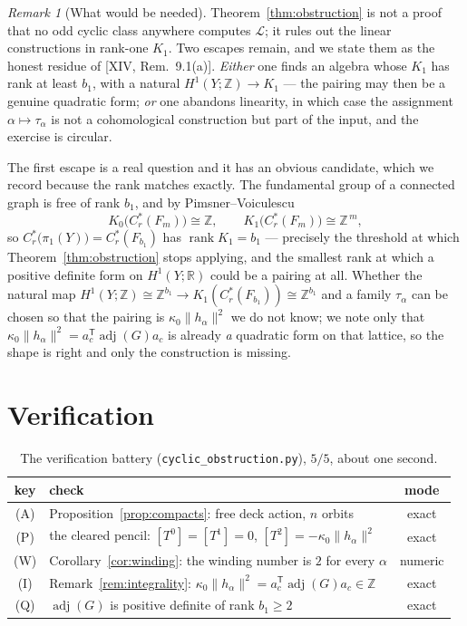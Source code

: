 \documentclass[11pt]{amsart}
\numberwithin{equation}{section}
\theoremstyle{definition}
\theoremstyle{remark}
\newtheorem{remark}[theorem]{Remark}
\newcommand{\Z}{\mathbb{Z}}
\newcommand{\R}{\mathbb{R}}
\newcommand{\cL}{\mathcal{L}}
\newcommand{\rank}{\operatorname{rank}}
\begin{document}
\begin{remark}[What would be needed]\label{rem:needed}
Theorem~\ref{thm:obstruction} is not a proof that no odd cyclic class anywhere computes
$\cL$; it rules out the linear constructions in rank-one $K_1$. Two escapes remain, and we
state them as the honest residue of [XIV, Rem.~9.1(a)]. \emph{Either} one finds an algebra
whose $K_1$ has rank at least $b_1$, with a natural $H^1(Y;\Z)\to K_1$ --- the pairing may
then be a genuine quadratic form; \emph{or} one abandons linearity, in which case the
assignment $\alpha\mapsto\tau_\alpha$ is not a cohomological construction but part of the
input, and the exercise is circular.

The first escape is a real question and it has an obvious candidate, which we record
because the rank matches exactly. The fundamental group of a connected graph is free of
rank $b_1$, and by Pimsner--Voiculescu
\[
K_0\bigl(C^*_r(F_m)\bigr)\cong\Z,\qquad K_1\bigl(C^*_r(F_m)\bigr)\cong\Z^{\,m},
\]
so $C^*_r\bigl(\pi_1(Y)\bigr)=C^*_r(F_{b_1})$ has $\rank K_1=b_1$ --- precisely the
threshold at which Theorem~\ref{thm:obstruction} stops applying, and the smallest rank at
which a positive definite form on $H^1(Y;\R)$ could be a pairing at all. Whether the
natural map $H^1(Y;\Z)\cong\Z^{b_1}\to K_1(C^*_r(F_{b_1}))\cong\Z^{b_1}$ and a family
$\tau_\alpha$ can be chosen so that the pairing is $\kappa_0\|h_\alpha\|^2$ we do not
know; we note only that $\kappa_0\|h_\alpha\|^2=a_c^{\mathsf T}\operatorname{adj}(G)a_c$ is
already \emph{a} quadratic form on that lattice, so the shape is right and only the
construction is missing.
\end{remark}

\section{Verification}\label{sec:battery}

\begin{table}[ht]
\centering\small
\begin{tabular}{clc}
\toprule
key & check & mode\\
\midrule
(A) & Proposition~\ref{prop:compacts}: free deck action, $n$ orbits & exact\\
(P) & the cleared pencil: $[T^0]=[T^1]=0$, $[T^2]=-\kappa_0\|h_\alpha\|^2$ & exact\\
(W) & Corollary~\ref{cor:winding}: the winding number is $2$ for every $\alpha$ & numeric\\
(I) & Remark~\ref{rem:integrality}: $\kappa_0\|h_\alpha\|^2=a_c^{\mathsf T}\operatorname{adj}(G)a_c\in\Z$ & exact\\
(Q) & $\operatorname{adj}(G)$ is positive definite of rank $b_1\ge2$ & exact\\
\bottomrule
\end{tabular}
\caption{The verification battery (\texttt{cyclic\_obstruction.py}), $5/5$, about one
second.}
\label{tab:battery}
\end{table}
\end{document}
